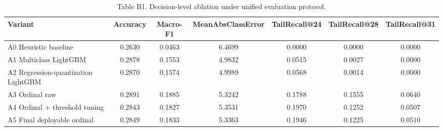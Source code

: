 \begin{table}[t]
\centering
\caption{Table B1. Decision-level ablation under unified evaluation protocol.}
\label{tab:b1_ablation_decision}
\setlength{\tabcolsep}{4pt}
\begin{tabular}{lcccccc}
\toprule
Variant & Accuracy & Macro-F1 & MeanAbsClassError & TailRecall@24 & TailRecall@28 & TailRecall@31 \\
\midrule
A0 Heuristic baseline & 0.2630 & 0.0463 & 6.4699 & 0.0000 & 0.0000 & 0.0000 \\
A1 Multiclass LightGBM & 0.2878 & 0.1553 & 4.9832 & 0.0515 & 0.0027 & 0.0000 \\
A2 Regression-quantization LightGBM & 0.2870 & 0.1574 & 4.9989 & 0.0568 & 0.0014 & 0.0000 \\
A3 Ordinal raw & 0.2891 & 0.1885 & 5.3242 & 0.1788 & 0.1555 & 0.0640 \\
A4 Ordinal + threshold tuning & 0.2843 & 0.1827 & 5.3531 & 0.1970 & 0.1252 & 0.0507 \\
A5 Final deployable ordinal & 0.2849 & 0.1833 & 5.3363 & 0.1946 & 0.1225 & 0.0510 \\
\bottomrule
\end{tabular}
\end{table}
